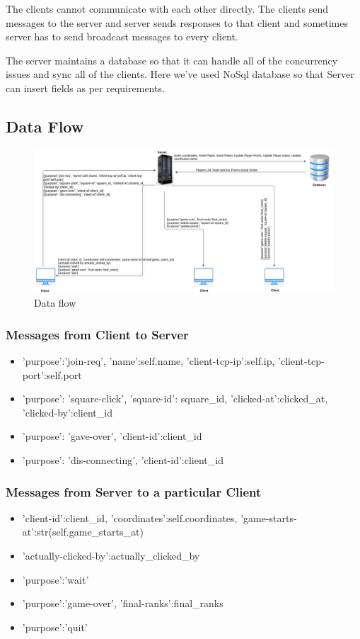 \documentclass[manuscript,screen,review,nonacm]{acmart}
\begin{document}
The clients cannot communicate with each other directly. 
The clients send messages to the server and server sends responses to that client and sometimes server has to send broadcast messages to every client. 

The server maintains a database so that it can handle all of the concurrency issues and sync all of the clients. 
Here we've used NoSql database so that Server can insert fields as per requirements.

\subsection{Data Flow}

\begin{figure}[htp]
    \centering
    \includegraphics[width=15cm]{dataflow.png}
    \caption{Data flow}
    \label{fig:galaxy}
\end{figure}

\subsubsection{Messages from Client to Server}
\begin{itemize}
    \item {'purpose':'join-req', 'name':self.name, 'client-tcp-ip':self.ip, 'client-tcp-port':self.port}
    \item {'purpose': 'square-click', 'square-id': square\_id, 'clicked-at':clicked\_at, 'clicked-by':client\_id}
    \item {'purpose': 'gave-over', 'client-id':client\_id}
    \item {'purpose': 'dis-connecting', 'client-id':client\_id} 
\end{itemize}

\subsubsection{Messages from Server to a particular Client}
\begin{itemize}
    \item {'client-id':client\_id, 'coordinates':self.coordinates, 'game-starts-at':str(self.game\_starts\_at)}
    \item {'actually-clicked-by':actually\_clicked\_by}
    \item {'purpose':'wait'}
    \item {'purpose':'game-over', 'final-ranks':final\_ranks}
    \item {'purpose':'quit'}
\end{itemize}
\end{document}
